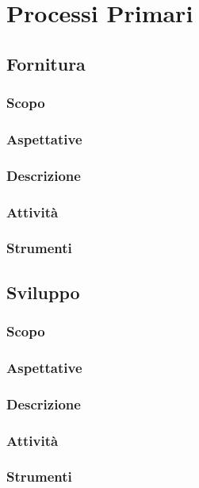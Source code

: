 \section{Processi Primari}
\subsection{Fornitura}
\subsubsection{Scopo}
\subsubsection{Aspettative}
\subsubsection{Descrizione}
\subsubsection{Attività}
\subsubsection{Strumenti}
\subsection{Sviluppo}
\subsubsection{Scopo}
\subsubsection{Aspettative}
\subsubsection{Descrizione}
\subsubsection{Attività}
\subsubsection{Strumenti}